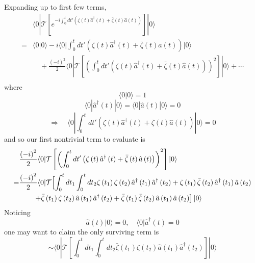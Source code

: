 Expanding up to first few terms,
\begin{align*}
    &\langle 0|\mathcal{T} \left[ e^{-i\int_0^t{dt'\left( \zeta \left( t \right) \hat{a}^{\dagger}\left( t \right) +\bar{\zeta}\left( t \right) \hat{a}\left( t \right) \right)}} \right] |0\rangle \\
    =&\langle 0|0\rangle -i\langle 0|\int_0^t{dt'\left( \zeta \left( t \right) \hat{a}^{\dagger}\left( t \right) +\bar{\zeta}\left( t \right) \hat{a}\left( t \right) \right)}|0\rangle \\
    &\quad +\frac{\left( -i \right) ^2}{2}\langle 0|\mathcal{T} \left[ \left( \int_0^t{dt'\left( \zeta \left( t \right) \hat{a}^{\dagger}\left( t \right) +\bar{\zeta}\left( t \right) \hat{a}\left( t \right) \right)} \right) ^2 \right] |0\rangle +\cdots \\
\end{align*}
where
\[ \langle 0|0\rangle =1\]
\[\langle 0|\hat{a}^{\dagger}\left( t \right) |0\rangle =\langle 0|\hat{a}\left( t \right) |0\rangle =0\]
\[ \Rightarrow \quad \langle 0|\int_0^t{dt'\left( \zeta \left( t \right) \hat{a}^{\dagger}\left( t \right) +\bar{\zeta}\left( t \right) \hat{a}\left( t \right) \right)}|0\rangle =0\]
and so our first nontrivial term to evaluate is
\begin{align*}
    &\frac{\left( -i \right) ^2}{2}\langle 0|\mathcal{T} \left[ \left( \int_0^t{dt'\left( \zeta \left( t \right) \hat{a}^{\dagger}\left( t \right) +\bar{\zeta}\left( t \right) \hat{a}\left( t \right) \right)} \right) ^2 \right] |0\rangle \\
    =&\frac{\left( -i \right) ^2}{2}\langle 0|\mathcal{T} \Bigl[ \int_0^t{dt_1\int_0^t{dt_2}}\zeta \left( t_1 \right) \zeta \left( t_2 \right) \hat{a}^{\dagger}\left( t_1 \right) \hat{a}^{\dagger}\left( t_2 \right) +\zeta \left( t_1 \right) \bar{\zeta}\left( t_2 \right) \hat{a}^{\dagger}\left( t_1 \right) \hat{a}\left( t_2 \right) \\
    &\qquad \left. +\bar{\zeta}\left( t_1 \right) \zeta \left( t_2 \right) \hat{a}\left( t_1 \right) \hat{a}^{\dagger}\left( t_2 \right) +\bar{\zeta}\left( t_1 \right) \bar{\zeta}\left( t_2 \right) \hat{a}\left( t_1 \right) \hat{a}\left( t_2 \right) \right] |0\rangle
\end{align*}
Noticing
\[\hat{a}\left( t \right) |0\rangle =0,\quad \langle 0|\hat{a}^{\dagger}\left( t \right) =0 \]
one may want to claim the only surviving term is
\[ \sim \langle 0|\mathcal{T} \left[ \int_0^t{dt_1\int_0^t{dt_2\bar{\zeta}\left( t_1 \right) \zeta \left( t_2 \right) \hat{a}\left( t_1 \right) \hat{a}^{\dagger}\left( t_2 \right)}} \right] |0\rangle \]
